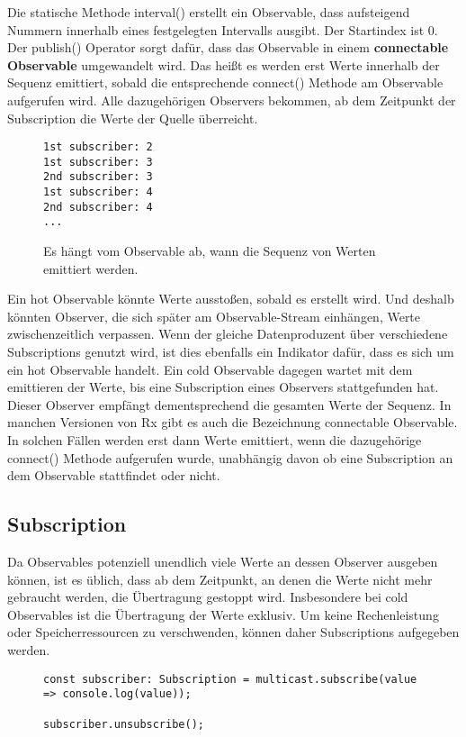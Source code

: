 \noindent
Die statische Methode interval() erstellt ein Observable, dass aufsteigend Nummern innerhalb eines festgelegten Intervalls ausgibt. Der Startindex ist 0. Der publish() Operator sorgt dafür, dass das Observable in einem \textbf{connectable Observable} umgewandelt wird. Das heißt es werden erst Werte innerhalb der Sequenz emittiert, sobald die entsprechende connect() Methode am Observable aufgerufen wird. Alle dazugehörigen Observers bekommen, ab dem Zeitpunkt der Subscription die Werte der Quelle überreicht.\\

\begin{figure}[H]
\begin{lstlisting}
1st subscriber: 2
1st subscriber: 3
2nd subscriber: 3
1st subscriber: 4
2nd subscriber: 4
...
\end{lstlisting}
\caption{Es hängt vom Observable ab, wann die Sequenz von Werten emittiert werden.}
\end{figure}

\noindent
Ein hot Observable könnte Werte ausstoßen, sobald es erstellt wird. Und deshalb könnten Observer, die sich später am Observable-Stream einhängen, Werte zwischenzeitlich verpassen. Wenn der gleiche Datenproduzent über verschiedene Subscriptions genutzt wird, ist dies ebenfalls ein Indikator dafür, dass es sich um ein hot Observable handelt. Ein cold Observable dagegen wartet mit dem emittieren der Werte, bis eine Subscription eines Observers stattgefunden hat. Dieser Observer empfängt dementsprechend die gesamten Werte der Sequenz. In manchen Versionen von Rx gibt es auch die Bezeichnung connectable Observable. In solchen Fällen werden erst dann Werte emittiert, wenn die dazugehörige connect() Methode aufgerufen wurde, unabhängig davon ob eine Subscription an dem Observable stattfindet oder nicht\cite{hot-vs-cold-part-2}.

\subsection{Subscription}

Da Observables potenziell unendlich viele Werte an dessen Observer ausgeben können, ist es üblich, dass ab dem Zeitpunkt, an denen die Werte nicht mehr gebraucht werden, die Übertragung gestoppt wird. Insbesondere bei cold Observables ist die Übertragung der Werte exklusiv. Um keine Rechenleistung oder Speicherressourcen zu verschwenden, können daher Subscriptions aufgegeben werden.

\begin{figure}[H]
\begin{lstlisting}[basicstyle=\small]
const subscriber: Subscription = multicast.subscribe(value => console.log(value));

subscriber.unsubscribe();
\end{lstlisting}
\end{figure}

